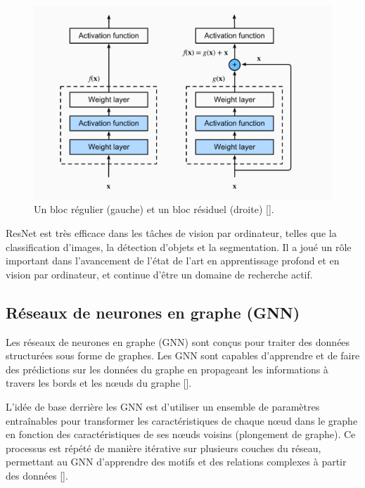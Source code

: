 \begin{figure}[hbt!]
	\centering
	\includegraphics[width=12cm]{images_pfe/residual-net.png}
	\caption{Un bloc régulier (gauche) et un bloc résiduel (droite) [\cite{dong_niu_li_xie_zou_ye_wei_pan_2022}].}
	\label{fig:residual-net}
\end{figure}
\FloatBarrier

\medskip
ResNet est très efficace dans les tâches de vision par ordinateur, telles que la classification d'images, la détection d'objets et la segmentation. Il a joué un rôle important dans l'avancement de l'état de l'art en apprentissage profond et en vision par ordinateur, et continue d'être un domaine de recherche actif.

\subsection{Réseaux de neurones en graphe (GNN)}
Les réseaux de neurones en graphe (GNN) sont conçus pour traiter des données
structurées sous forme de graphes. Les GNN sont capables d'apprendre et de
faire des prédictions sur les données du graphe en propageant les informations
à travers les bords et les nœuds du graphe [\cite{ZHOU202057}].

\medskip
L'idée de base derrière les GNN est d'utiliser un ensemble de paramètres entraînables pour transformer les caractéristiques de chaque nœud dans le graphe en fonction des caractéristiques de ses nœuds voisins (plongement de graphe). Ce processus est répété de manière itérative sur plusieurs couches du réseau, permettant au GNN d'apprendre des motifs et des relations complexes à partir des données [\cite{ZHOU202057}].

